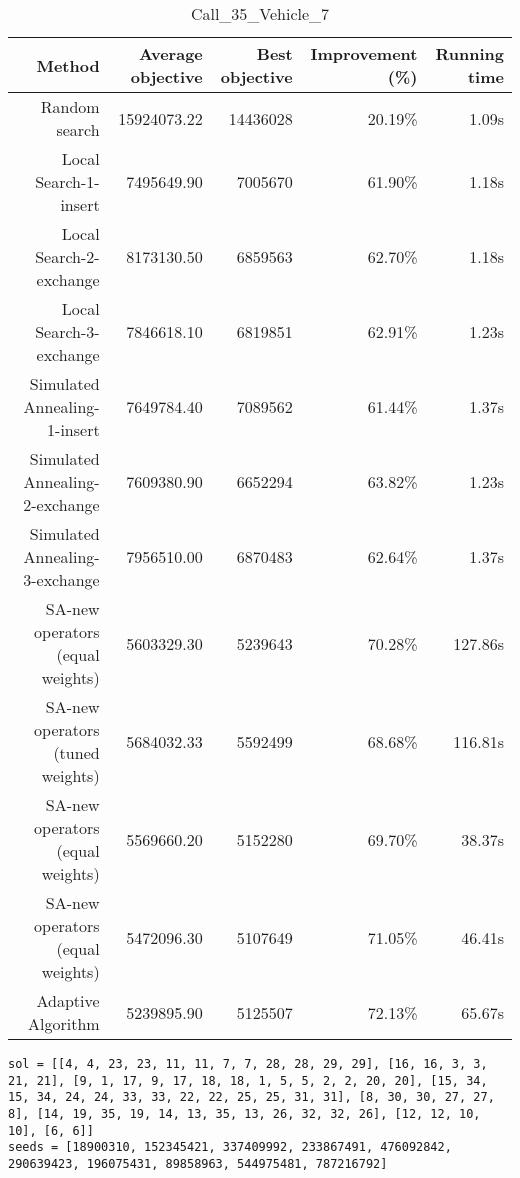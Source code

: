 \begin{table}[ht]
\centering
\caption{Call\_35\_Vehicle\_7}
\label{tab:call35vehicle7}
\begin{tabular}{|r|r|r|r|r|}
Method & Average objective & Best objective & Improvement (\%) & Running time \\
\hline
Random search & 15924073.22 & 14436028 & 20.19\% & 1.09s\\
Local Search-1-insert & 7495649.90 & 7005670 & 61.90\% & 1.18s\\
Local Search-2-exchange & 8173130.50 & 6859563 & 62.70\% & 1.18s\\
Local Search-3-exchange & 7846618.10 & 6819851 & 62.91\% & 1.23s\\
Simulated Annealing-1-insert & 7649784.40 & 7089562 & 61.44\% & 1.37s\\
Simulated Annealing-2-exchange & 7609380.90 & 6652294 & 63.82\% & 1.23s\\
Simulated Annealing-3-exchange & 7956510.00 & 6870483 & 62.64\% & 1.37s\\
SA-new operators (equal weights) & 5603329.30 & 5239643 & 70.28\% & 127.86s\\
SA-new operators (tuned weights) & 5684032.33 & 5592499 & 68.68\% & 116.81s\\
SA-new operators (equal weights) & 5569660.20 & 5152280 & 69.70\% & 38.37s\\
SA-new operators (equal weights) & 5472096.30 & 5107649 & 71.05\% & 46.41s\\
Adaptive Algorithm & 5239895.90 & 5125507 & 72.13\% & 65.67s\\
\end{tabular}%
\end{table}
\begin{lstlisting}[label={lst:call35vehicle7},caption=Optimal solution call\_35\_vehicle\_7]
sol = [[4, 4, 23, 23, 11, 11, 7, 7, 28, 28, 29, 29], [16, 16, 3, 3, 21, 21], [9, 1, 17, 9, 17, 18, 18, 1, 5, 5, 2, 2, 20, 20], [15, 34, 15, 34, 24, 24, 33, 33, 22, 22, 25, 25, 31, 31], [8, 30, 30, 27, 27, 8], [14, 19, 35, 19, 14, 13, 35, 13, 26, 32, 32, 26], [12, 12, 10, 10], [6, 6]]
seeds = [18900310, 152345421, 337409992, 233867491, 476092842, 290639423, 196075431, 89858963, 544975481, 787216792]
\end{lstlisting}%
\clearpage


